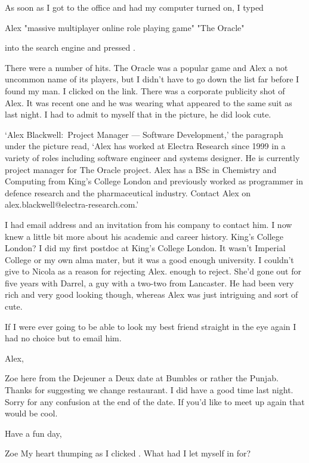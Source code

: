 As soon as I got to the office and had my computer turned on, I
typed

\startmessage
Alex "massive multiplayer online role playing game" "The Oracle"
\stopmessage

into the search engine and pressed .

There were a number of hits. {\twelvesl The Oracle\/} was
a popular game and Alex a not uncommon name of its players, but I didn't have to go down the list far before I found
my man. I clicked on the link. There was a corporate publicity shot
of Alex. It was recent one and he was wearing what appeared to the same
suit as last night. I had to admit to myself that in the picture, he
did look cute.

`Alex Blackwell:~Project Manager --- Software Development,' the
paragraph under the picture read, `Alex has worked at Electra
Research since 1999 in a variety of roles including software
engineer and systems designer. He is currently project manager for
{\twelvesl The Oracle\/} project. Alex has a BSc in Chemistry and Computing from
King's College London and previously worked as programmer in defence research and the pharmaceutical industry. Contact Alex on
alex.blackwell@electra-research.com.'

I had email address and an invitation from his company to contact
him. I now knew a little bit more about his academic and career
history. King's College London? I did my first postdoc at King's
College London. It wasn't Imperial College or my own alma
mater, but it was a good enough university. I couldn't give to Nicola as
a reason for rejecting Alex. enough to reject. She'd
gone out for five years with Darrel, a guy with a two-two from Lancaster. He had been very rich and very good looking though, whereas
Alex was just intriguing and sort of cute.

If I were ever going to be able to look my best friend straight in
the eye again I had no choice but to email him.

\startmessage
Alex,

Zoe here from the Dejeuner a Deux date at Bumbles
or rather the Punjab. Thanks for suggesting we
change restaurant. I did have a good time
last night. Sorry for any confusion at the end
of the date. If you'd like to meet up again
that would be cool.

Have a fun day,

Zoe
\stopmessage
\vskip 12pt
My heart thumping as I clicked .  What had I let
myself in for?

